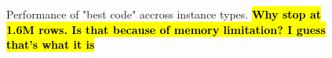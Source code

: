 \documentclass[10pt,conference,compsocconf]{IEEEtran}
\newcommand{\todo}[1]{{\color{red}\textbf{\hl{#1}}\xspace}}
\begin{document}
\begin{figure}[t]
  \centering

  \caption{Performance of "best code" accross instance types. \todo{Why stop at 1.6M
      rows. Is that because of memory limitation? I guess that's what
      it is}}
\end{figure}
\end{document}

